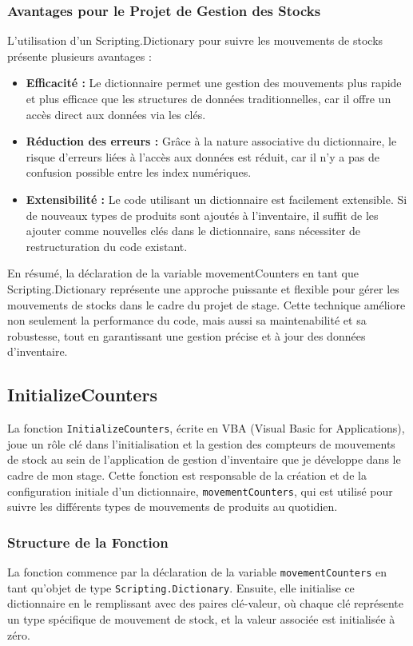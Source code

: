 \documentclass[a4paper, oneside, 12pt, final]{extreport}
\begin{document}
\subsubsection{Avantages pour le Projet de Gestion des Stocks}
L'utilisation d'un Scripting.Dictionary pour suivre les mouvements de stocks présente plusieurs avantages :
\begin{itemize}


\item \textbf{Efficacité :} Le dictionnaire permet une gestion des mouvements plus rapide et plus efficace que les structures de données traditionnelles, car il offre un accès direct aux données via les clés.

\item \textbf{Réduction des erreurs :} Grâce à la nature associative du dictionnaire, le risque d'erreurs liées à l'accès aux données est réduit, car il n'y a pas de confusion possible entre les index numériques.

\item \textbf{Extensibilité :} Le code utilisant un dictionnaire est facilement extensible. Si de nouveaux types de produits sont ajoutés à l'inventaire, il suffit de les ajouter comme nouvelles clés dans le dictionnaire, sans nécessiter de restructuration du code existant.
\end{itemize}

En résumé, la déclaration de la variable movementCounters en tant que Scripting.Dictionary représente une approche puissante et flexible pour gérer les mouvements de stocks dans le cadre du projet de stage. Cette technique améliore non seulement la performance du code, mais aussi sa maintenabilité et sa robustesse, tout en garantissant une gestion précise et à jour des données d'inventaire.
\subsection{InitializeCounters}
La fonction \texttt{InitializeCounters}, écrite en VBA (Visual Basic for Applications), joue un rôle clé dans l'initialisation et la gestion des compteurs de mouvements de stock au sein de l'application de gestion d'inventaire que je développe dans le cadre de mon stage. Cette fonction est responsable de la création et de la configuration initiale d'un dictionnaire, \texttt{movementCounters}, qui est utilisé pour suivre les différents types de mouvements de produits au quotidien.

\subsubsection{Structure de la Fonction}
La fonction commence par la déclaration de la variable \texttt{movementCounters} en tant qu'objet de type \texttt{Scripting.Dictionary}. Ensuite, elle initialise ce dictionnaire en le remplissant avec des paires clé-valeur, où chaque clé représente un type spécifique de mouvement de stock, et la valeur associée est initialisée à zéro.
\end{document}
